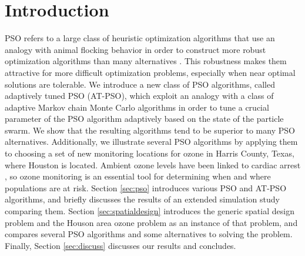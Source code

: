 \documentclass[cmbright]{staauth}
\begin{document}
\section{Introduction}
PSO refers to a large class of heuristic optimization algorithms that use an analogy with animal flocking behavior in order to construct more robust optimization algorithms than many alternatives \citep{clerc2002particle,blum2008swarm,clerc2010particle}. This robustness makes them attractive for more difficult optimization problems, especially when near optimal solutions are tolerable. We introduce a new class of PSO algorithms, called adaptively tuned PSO (AT-PSO), which exploit an analogy with a class of adaptive Markov chain Monte Carlo algorithms in order to tune a crucial parameter of the PSO algorithm adaptively based on the state of the particle swarm. We show that the resulting algorithms tend to be superior to many PSO alternatives. Additionally, we illustrate several PSO algorithms by applying them to choosing a set of new monitoring locations for ozone in Harris County, Texas, where Houston is located. Ambient ozone levels have been linked to cardiac arrest \citep{ensor2013case}, so ozone monitoring is an essential tool for determining when and where populations are at risk. Section \ref{sec:pso} introduces various PSO and AT-PSO algorithms, and briefly discusses the results of an extended simulation study comparing them. Section \ref{sec:spatialdesign} introduces the generic spatial design problem and the Houson area ozone problem as an instance of that problem, and compares several PSO algorithms and some alternatives to solving the problem. Finally, Section \ref{sec:discuss} discusses our results and concludes.
\end{document}
